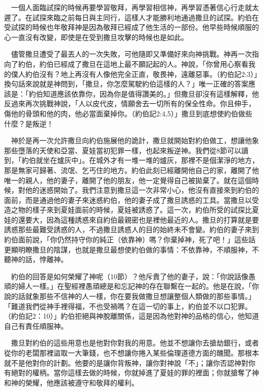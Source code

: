 \documentclass{book}
\begin{document}
　一個人面臨試探的時候再要學習敬拜，再學習相信神，再學習憑著信心行走就太遲了。在試探來臨之前每日與主同行，這樣人才能勝利地通過撒旦的試探。約伯在受試探的時候也年敬拜神是因為敬拜已經成了他生活的一部份。他早些時候順服的心一直沒有改變，即使是在受到撒旦攻擊的時候也是如此。

　儘管撒旦遭受了最丟人的一次失敗，可他隨即又準備好來向神挑戰。神再一次指向了約伯，約伯已經成了撒旦在這地上最不願記起的人。神說，「你曾用心察看我的僕人約伯沒有？地上再沒有人像他完全正直，敬畏神，遠離惡事。（約伯記2:3）」換句話來說就是神問到，「撒旦，你怎麼駕駛約伯這樣的人？」唯一正確的答案應該是：「約伯知道應該依靠你，因為你是值得讚美的。」但撒旦卻沒有這樣解釋，他反過來再次挑戰神說，「人以皮代皮，情願舍去一切所有的保全性命。你且伸手，傷他的骨頭和他的肉，他必當面棄掉你。（約伯記2:4,5）」撒旦到底想使約伯做些什麼？是叛逆！

　神於是再一次允許撒旦向約伯施展他的詭計，撒旦就開始對約伯做工，想讓他象那些墮落的天使和亞當、夏娃當初犯罪一樣，也起來叛逆神。我們從8節可以讀到，「約伯就坐在爐灰中」。在城外才有一堆一堆的爐灰，那裡不是個潔淨的地方，那是無家可歸著、流氓、乞丐住的地方。約伯此刻已經離開他自己的家，離開了他唯一的親人，他的妻子，離開了他的朋友，他一定覺得自己被拋棄了。就在這個時候，對他的迷惑開始了。我們注意到撒旦這一次非常小心，他沒有直接來到約伯的面前，而是通過他的妻子來迷惑約伯，他的妻子成了撒旦誘惑的工具。當撒旦以受造之物的樣子來到夏娃面前的時候，夏娃被誘惑了。這一次，約伯所受的試探比夏娃的還要大，因為這種誘惑來自約伯最親密也是裡他最近的人。撒旦的打算就是要誘惑那些最難受誘惑的人，不過撒旦誘惑人的目的始終未不會變。約伯的妻子來到約伯面前說，「你仍然持守你的純正（依靠神）嗎？你棄掉神，死了吧！」這些話更顯明瞭撒旦的陰謀，也就是撒旦最想使約伯做的事情：不依靠神，不順服神，不聽神的話，悖離神。

　約伯的回答是如何榮耀了神呢（10節）？他斥責了他的妻子，說：「你說話像愚頑的婦人一樣。」在聖經裡愚頑總是和忘記神的存在聯繫在一起的。他是在說，「你說的話就象那些不信神的人一樣，你在要我做撒旦想讓整個人類做的那些事情。」「難道我們從神手裡得福，不也受禍嗎？在這一切的事上，約伯並不以口犯罪。（約伯記2：10）」約伯拒絕與神脫離關係，這是因為他對神的品格的信心，他知道自己有責任順服神。

　撒旦對約伯的這些用意也是他對你對我的用意。他並不想讓你去搶劫銀行，或者從你的老闆那裡盜取一大筆錢，也不想讓你捲入某些倫理道德方面的醜聞。那根本就不是他對你的計劃。他要的是讓你背叛神，讓你對神說「不」；讓你否認神對你有絕對的權柄。當你這樣去做的時候，你就掉進了夏娃的罪的裡面；你就搶奪了神和神的榮耀，他應該被遵守和敬拜的權利。
\end{document}
